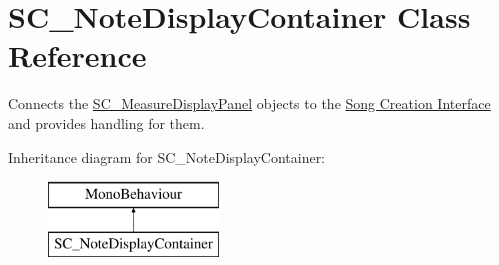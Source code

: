 \hypertarget{class_s_c___note_display_container}{}\section{S\+C\+\_\+\+Note\+Display\+Container Class Reference}
\label{class_s_c___note_display_container}


Connects the \hyperlink{class_s_c___measure_display_panel}{S\+C\+\_\+\+Measure\+Display\+Panel} objects to the \hyperlink{group___doc_s_c}{Song Creation Interface} and provides handling for them.  


Inheritance diagram for S\+C\+\_\+\+Note\+Display\+Container\+:\begin{figure}[H]
\begin{center}
\leavevmode
\includegraphics[height=2.000000cm]{class_s_c___note_display_container}
\end{center}
\end{figure}
